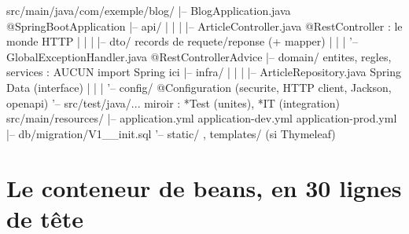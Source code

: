 \begin{codeplain}
src/main/java/com/exemple/blog/
|-- BlogApplication.java                 @SpringBootApplication
|-- api/
|   |   |   |-- ArticleController.java           @RestController : le monde HTTP
|   |   |   |-- dto/                             records de requete/reponse (+ mapper)
|   |   |   '-- GlobalExceptionHandler.java      @RestControllerAdvice
|-- domain/                              entites, regles, services : AUCUN import Spring ici
|-- infra/
|   |   |   |-- ArticleRepository.java           Spring Data (interface)
|   |   |   '-- config/                          @Configuration (securite, HTTP client, Jackson, openapi)
'-- src/test/java/...                     miroir : *Test (unites), *IT (integration)
src/main/resources/
|-- application.yml  application-dev.yml  application-prod.yml
|-- db/migration/V1__init.sql
'-- static/ , templates/ (si Thymeleaf)
\end{codeplain}

\section{Le conteneur de beans, en 30 lignes de t\^ete}

